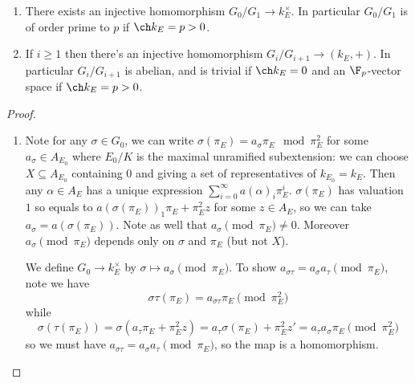 \documentclass[a4paper]{article}
\begin{document}
\begin{proposition}\leavevmode
  \begin{enumerate}
  \item There exists an injective homomorphism \(G_0/G_1 \to k_E^\times\). In particular \(G_0/G_1\) is of order prime to \(p\) if \(\ch k_E = p > 0\).
  \item If \(i \geq 1\) then there's an injective homomorphism \(G_i/G_{i + 1} \to (k_E, +)\). In particular \(G_i/G_{i + 1}\) is abelian, and is trivial if \(\ch k_E = 0\) and an \(\F_p\)-vector space if \(\ch k_E = p > 0\).
  \end{enumerate}
\end{proposition}

\begin{proof}\leavevmode
  \begin{enumerate}
  \item Note for any \(\sigma \in G_0\), we can write \(\sigma(\pi_E) = a_\sigma \pi_E \mod{\pi_E^2}\) for some \(a_\sigma \in A_{E_0}\) where \(E_0/K\) is the maximal unramified subextension: we can choose \(X \subseteq A_{E_0}\) containing \(0\) and giving a set of representatives of \(k_{E_0} = k_E\). Then any \(\alpha \in A_E\) has a unique expression \(\sum_{i = 0}^\infty a(\alpha)_i \pi_E^i\). \(\sigma(\pi_E)\) has valuation \(1\) so equals to \(a(\sigma(\pi_E))_1 \pi_E + \pi_E^2 z\) for some \(z \in A_E\), so we can take \(a_\sigma = a(\sigma(\pi_E))\). Note as well that \(a_\sigma \pmod{\pi_E} \ne 0\). Moreover \(a_\sigma \pmod{\pi_E}\) depends only on \(\sigma\) and \(\pi_E\) (but not \(X\)).

    We define \(G_0 \to k_E^\times\) by \(\sigma \mapsto a_\sigma \pmod{\pi_E}\). To show \(a_{\sigma\tau} = a_\sigma a_\tau \pmod{\pi_E}\), note we have
    \[
      \sigma\tau (\pi_E) = a_{\sigma\tau} \pi_E \pmod{\pi_E^2}
    \]
    while
    \[
      \sigma(\tau(\pi_E)) = \sigma(a_\tau \pi_E + \pi_E^2 z) = a_\tau \sigma(\pi_E) + \pi_E^2 z' = a_\tau a_\sigma \pi_E \pmod{\pi_E^2}
    \]
    so we must have \(a_{\sigma\tau} = a_\sigma a_\tau \pmod{\pi_E}\), so the map is a homomorphism.


\end{enumerate}
\end{proof}
\end{document}
